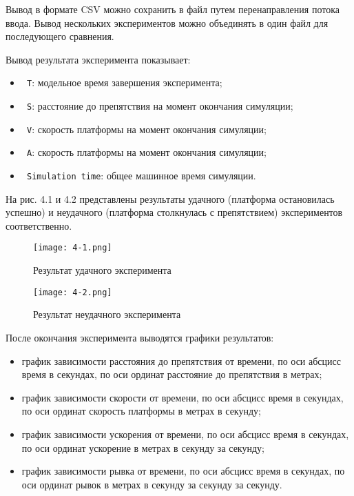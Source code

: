 Вывод в формате CSV можно сохранить в файл путем перенаправления потока ввода. Вывод нескольких экспериментов можно объединять в один файл для последующего сравнения.

Вывод результата эксперимента показывает:

\begin{itemize}
	\item \lstinline! T!: модельное время завершения эксперимента;
	\item \lstinline! S!: расстояние до препятствия на момент окончания симуляции;
	\item \lstinline! V!: скорость платформы на момент окончания симуляции;
	\item \lstinline! A!: скорость платформы на момент окончания симуляции;
	\item \lstinline! Simulation time!: общее машинное время симуляции.
\end{itemize}

На рис. 4.1 и 4.2 представлены результаты удачного (платформа остановилась успешно) и неудачного (платформа столкнулась с препятствием) экспериментов соответственно.

\begin{figure}[ht]
  \centering
  \texttt{[image: 4-1.png]}
  \caption{Результат удачного эксперимента }
\end{figure}

\begin{figure}[ht]
  \centering
  \texttt{[image: 4-2.png]}
  \caption{Результат неудачного эксперимента }
\end{figure}

После окончания эксперимента выводятся графики результатов:


\begin{itemize}
	\item график зависимости расстояния до препятствия от времени, по оси абсцисс время в секундах, по оси ординат расстояние до препятствия в метрах;
	\item график зависимости скорости от времени, по оси абсцисс время в секундах, по оси ординат скорость платформы в метрах в секунду;
	\item график зависимости ускорения от времени, по оси абсцисс время в секундах, по оси ординат ускорение в метрах в секунду за секунду;
	\item график зависимости рывка от времени, по оси абсцисс время в секундах, по оси ординат рывок в метрах в секунду за секунду за секунду.
\end{itemize}


